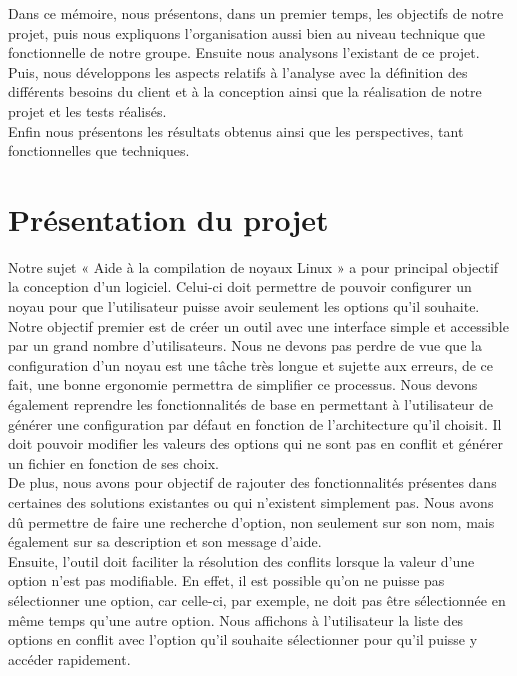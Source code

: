 \documentclass[16pts]{report}
\begin{document}
Dans ce mémoire, nous présentons, dans un premier temps, les objectifs de 
notre projet, puis nous expliquons l’organisation aussi bien au niveau 
technique que fonctionnelle de notre groupe. Ensuite nous analysons l'existant 
de ce projet.
\\

Puis, nous développons les aspects relatifs à l’analyse avec la définition 
des différents besoins du client et à la conception ainsi que la réalisation 
de notre projet et les tests réalisés.
\\

Enfin nous présentons les résultats obtenus ainsi que les perspectives, 
tant fonctionnelles que techniques.


\chapter{Présentation du projet}
\label{cha:Présentation du projet}

Notre sujet « Aide à la compilation de noyaux Linux » a pour principal 
objectif la conception d'un logiciel. Celui-ci doit permettre de pouvoir 
configurer un noyau pour que l'utilisateur puisse avoir seulement les 
options qu'il souhaite. 
\\

Notre objectif premier est de créer un outil avec une interface simple et 
accessible par un grand nombre d'utilisateurs. Nous ne devons pas perdre 
de vue que la configuration d'un noyau est une tâche très longue et 
sujette aux erreurs, de ce fait, une bonne ergonomie permettra de 
simplifier ce processus. Nous devons également reprendre les fonctionnalités 
de base en permettant à l'utilisateur de générer une configuration par 
défaut en fonction de l'architecture qu'il choisit. Il doit pouvoir 
modifier les valeurs des options qui ne sont pas en conflit et générer 
un fichier en fonction de ses choix.
\\

De plus, nous avons pour objectif de rajouter des fonctionnalités présentes 
dans certaines des solutions existantes ou qui n'existent simplement pas. 
Nous avons dû permettre de faire une recherche d'option, non seulement 
sur son nom, mais également sur sa description et son message d'aide.
\\

Ensuite, l'outil doit faciliter la résolution des conflits lorsque la 
valeur d'une option n'est pas modifiable. En effet, il est possible qu'on 
ne puisse pas sélectionner une option, car celle-ci, par exemple, ne doit 
pas être sélectionnée en même temps qu'une autre option. Nous affichons 
à l'utilisateur la liste des options en conflit avec l'option qu'il 
souhaite sélectionner pour qu'il puisse y accéder rapidement.
\\
\end{document}
